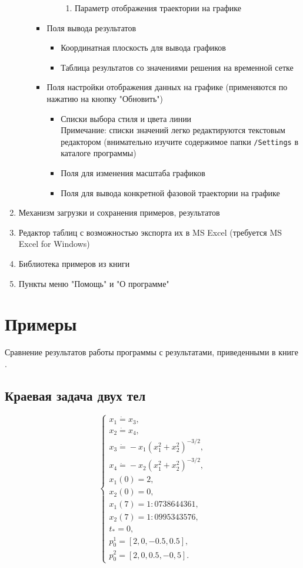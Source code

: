 \begin{enumerate}
\begin{enumerate}
\begin{itemize}
\begin{itemize}
\begin {enumerate}
\item Параметр отображения траектории на графике
\end{enumerate}
\end{itemize}
\item Поля вывода результатов
\begin{itemize}
\item Координатная плоскость для вывода графиков
\item Таблица результатов со значениями решения на временной сетке
\end{itemize}
\item Поля настройки отображения данных на графике (применяются по нажатию на кнопку "Обновить")
\begin{itemize}
\item Списки выбора стиля и цвета линии \\Примечание: списки значений легко редактируются тек\-стовым редактором (внимательно изучите содержимое папки \texttt{/Settings} в каталоге программы)
\item Поля для изменения масштаба графиков
\item Поля для вывода конкретной фазовой траектории на графике
\end{itemize}
\end{itemize}
\end{enumerate}
\item Механизм загрузки и сохранения примеров, результатов
\item Редактор таблиц с возможностью экспорта их в MS Excel (требуется MS Excel for Windows\textregistered)
\item Библиотека примеров из книги \cite{oy}
\item Пункты меню "Помощь"  и "О программе"
\end{enumerate}

\newpage
\section{Примеры}
Сравнение результатов работы программы с результатами, приведенными в книге \cite{oy}.
\subsection {Краевая задача двух тел}
\begin{equation*}
\begin{cases}
x_1\dot=x_3,\\
x_2\dot=x_4,\\
x_3\dot=-x_1(x_1^2+x_2^2)^{-3/2},\\
x_4\dot=-x_2(x_1^2+x_2^2)^{-3/2},\\
x_1(0)=2,\\
x_2(0)=0,\\
x_1(7)=1:0738644361,\\
x_2(7)=1:0995343576,\\
t_*=0,\\
p_0^1=[2,0,-0.5,0.5],\\
p_0^2=[2,0,0.5,-0,5].
\end{cases}
\end{equation*}

